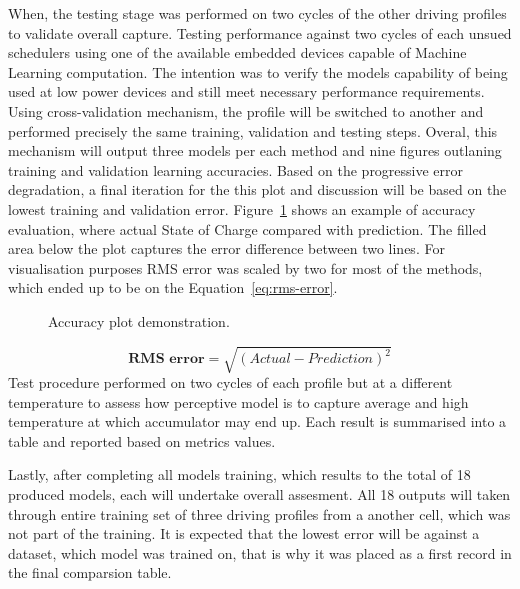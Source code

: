 %
%
When, the testing stage was performed on two cycles of the other driving profiles to validate overall capture.
Testing performance against two cycles of each unsued schedulers using one of the available embedded devices capable of Machine Learning computation.
The intention was to verify the models capability of being used at low power devices and still meet necessary performance requirements.
%
Using cross-validation mechanism, the profile will be switched to another and performed precisely the same training, validation and testing steps.
Overal, this mechanism will output three models per each method and nine figures outlaning training and validation learning accuracies.
%
Based on the progressive error degradation, a final iteration for the this plot and discussion will be based on the lowest training and validation error.
%
Figure~\ref{fig:plot_demo} shows an example of accuracy evaluation, where actual State of Charge compared with prediction.
The filled area below the plot captures the error difference between two lines.
For visualisation purposes RMS error was scaled by two for most of the methods, which ended up to be on the Equation~\ref{eq:rms-error}.
\begin{figure}[ht]
    \centering
    
    \caption{Accuracy plot demonstration.}
    \label{fig:plot_demo}
\end{figure}
\begin{equation}
    \textbf{RMS error}  = \sqrt{(Actual-Prediction)^2}
    \label{eq:rms-error}
\end{equation}
Test procedure performed on two cycles of each profile but at a different temperature to assess how perceptive model is to capture average and high temperature at which accumulator may end up.
Each result is summarised into a table and reported based on metrics values.

%
%
Lastly, after completing all models training, which results to the total of 18 produced models, each will undertake overall assesment.
All 18 outputs will taken through entire training set of three driving profiles from a another cell, which was not part of the training.
It is expected that the lowest error will be against a dataset, which model was trained on, that is why it was placed as a first record in the final comparsion table.
%

